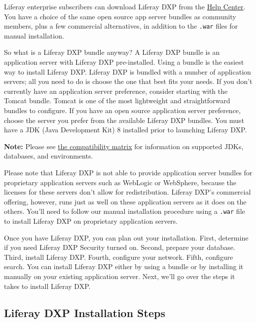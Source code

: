 Liferay enterprise subscribers can download Liferay DXP from the
\href{https://help.liferay.com/hc}{Help Center}. You have a choice of
the same open source app server bundles as community members, plus a few
commercial alternatives, in addition to the \texttt{.war} files for
manual installation.

So what is a Liferay DXP bundle anyway? A Liferay DXP bundle is an
application server with Liferay DXP pre-installed. Using a bundle is the
easiest way to install Liferay DXP. Liferay DXP is bundled with a number
of application servers; all you need to do is choose the one that best
fits your needs. If you don't currently have an application server
preference, consider starting with the Tomcat bundle. Tomcat is one of
the most lightweight and straightforward bundles to configure. If you
have an open source application server preference, choose the server you
prefer from the available Liferay DXP bundles. You must have a JDK (Java
Development Kit) 8 installed prior to launching Liferay DXP.

\noindent\hrulefill

\textbf{Note:} Please see
\href{https://help.liferay.com/hc/en-us/articles/360015783792-Liferay-DXP-7-0-Compatibility-Matrix}{the
compatibility matrix} for information on supported JDKs, databases, and
environments.

\noindent\hrulefill

Please note that Liferay DXP is not able to provide application server
bundles for proprietary application servers such as WebLogic or
WebSphere, because the licenses for these servers don't allow for
redistribution. Liferay DXP's commercial offering, however, runs just as
well on these application servers as it does on the others. You'll need
to follow our manual installation procedure using a \texttt{.war} file
to install Liferay DXP on proprietary application servers.

Once you have Liferay DXP, you can plan out your installation. First,
determine if you need Liferay DXP Security turned on. Second, prepare
your database. Third, install Liferay DXP. Fourth, configure your network.
Fifth, configure search. You can install Liferay DXP either by using a
bundle or by installing it manually on your existing application server.
Next, we'll go over the steps it takes to install Liferay DXP.

\subsection{Liferay DXP Installation
Steps}\label{liferay-dxp-installation-steps}

